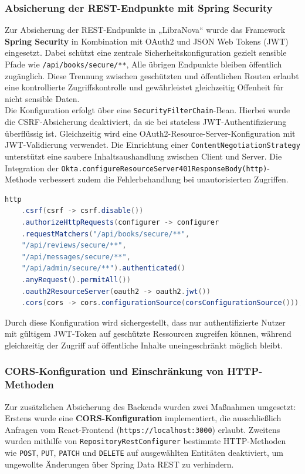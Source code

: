 \subsubsection{Absicherung der REST-Endpunkte mit Spring Security}

Zur Absicherung der REST-Endpunkte in „LibraNova“ wurde das Framework \textbf{Spring Security} in Kombination mit OAuth2 und JSON Web Tokens (JWT) eingesetzt. Dabei schützt eine zentrale Sicherheitskonfiguration gezielt sensible Pfade wie \texttt{/api/books/secure/\***}, Alle übrigen Endpunkte bleiben öffentlich zugänglich. Diese Trennung zwischen geschützten und öffentlichen Routen erlaubt eine kontrollierte Zugriffskontrolle und gewährleistet gleichzeitig Offenheit für nicht sensible Daten. \\ 
Die Konfiguration erfolgt über eine \texttt{SecurityFilterChain}-Bean. Hierbei wurde die CSRF-Absicherung deaktiviert, da sie bei stateless JWT-Authentifizierung überflüssig ist. Gleichzeitig wird eine OAuth2-Resource-Server-Konfiguration mit JWT-Validierung verwendet. Die Einrichtung einer \texttt{ContentNegotiationStrategy} unterstützt eine saubere Inhaltsaushandlung zwischen Client und Server. Die Integration der \texttt{Okta.configureResourceServer401ResponseBody(http)}-Methode verbessert zudem die Fehlerbehandlung bei unautorisierten Zugriffen.

\begin{lstlisting}[language=Java, caption={Spring Security-Konfiguration}]
	http
	.csrf(csrf -> csrf.disable())
	.authorizeHttpRequests(configurer -> configurer
	.requestMatchers("/api/books/secure/**", 
	"/api/reviews/secure/**", 
	"/api/messages/secure/**", 
	"/api/admin/secure/**").authenticated()
	.anyRequest().permitAll())
	.oauth2ResourceServer(oauth2 -> oauth2.jwt())
	.cors(cors -> cors.configurationSource(corsConfigurationSource()));
\end{lstlisting}
Durch diese Konfiguration wird sichergestellt, dass nur authentifizierte Nutzer mit gültigem JWT-Token auf geschützte Ressourcen zugreifen können, während gleichzeitig der Zugriff auf öffentliche Inhalte uneingeschränkt möglich bleibt.

\subsubsection{CORS-Konfiguration und Einschränkung von HTTP-Methoden}

Zur zusätzlichen Absicherung des Backends wurden zwei Maßnahmen umgesetzt: Erstens wurde eine \textbf{CORS-Konfiguration} implementiert, die ausschließlich Anfragen vom React-Frontend (\texttt{https://localhost:3000}) erlaubt. Zweitens wurden mithilfe von \texttt{RepositoryRestConfigurer} bestimmte HTTP-Methoden wie \texttt{POST}, \texttt{PUT}, \texttt{PATCH} und \texttt{DELETE} auf ausgewählten Entitäten deaktiviert, um ungewollte Änderungen über Spring Data REST zu verhindern.

